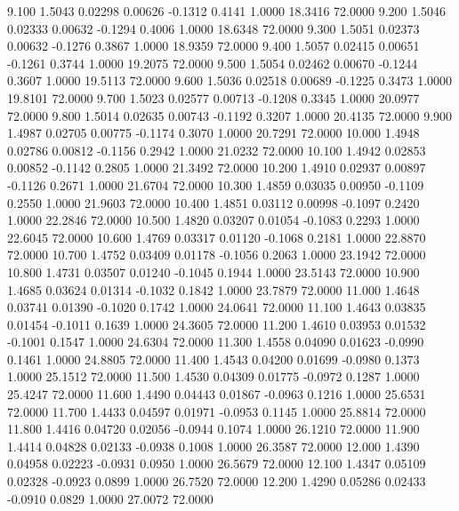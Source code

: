    9.100   1.5043   0.02298   0.00626  -0.1312   0.4141   1.0000  18.3416  72.0000
   9.200   1.5046   0.02333   0.00632  -0.1294   0.4006   1.0000  18.6348  72.0000
   9.300   1.5051   0.02373   0.00632  -0.1276   0.3867   1.0000  18.9359  72.0000
   9.400   1.5057   0.02415   0.00651  -0.1261   0.3744   1.0000  19.2075  72.0000
   9.500   1.5054   0.02462   0.00670  -0.1244   0.3607   1.0000  19.5113  72.0000
   9.600   1.5036   0.02518   0.00689  -0.1225   0.3473   1.0000  19.8101  72.0000
   9.700   1.5023   0.02577   0.00713  -0.1208   0.3345   1.0000  20.0977  72.0000
   9.800   1.5014   0.02635   0.00743  -0.1192   0.3207   1.0000  20.4135  72.0000
   9.900   1.4987   0.02705   0.00775  -0.1174   0.3070   1.0000  20.7291  72.0000
  10.000   1.4948   0.02786   0.00812  -0.1156   0.2942   1.0000  21.0232  72.0000
  10.100   1.4942   0.02853   0.00852  -0.1142   0.2805   1.0000  21.3492  72.0000
  10.200   1.4910   0.02937   0.00897  -0.1126   0.2671   1.0000  21.6704  72.0000
  10.300   1.4859   0.03035   0.00950  -0.1109   0.2550   1.0000  21.9603  72.0000
  10.400   1.4851   0.03112   0.00998  -0.1097   0.2420   1.0000  22.2846  72.0000
  10.500   1.4820   0.03207   0.01054  -0.1083   0.2293   1.0000  22.6045  72.0000
  10.600   1.4769   0.03317   0.01120  -0.1068   0.2181   1.0000  22.8870  72.0000
  10.700   1.4752   0.03409   0.01178  -0.1056   0.2063   1.0000  23.1942  72.0000
  10.800   1.4731   0.03507   0.01240  -0.1045   0.1944   1.0000  23.5143  72.0000
  10.900   1.4685   0.03624   0.01314  -0.1032   0.1842   1.0000  23.7879  72.0000
  11.000   1.4648   0.03741   0.01390  -0.1020   0.1742   1.0000  24.0641  72.0000
  11.100   1.4643   0.03835   0.01454  -0.1011   0.1639   1.0000  24.3605  72.0000
  11.200   1.4610   0.03953   0.01532  -0.1001   0.1547   1.0000  24.6304  72.0000
  11.300   1.4558   0.04090   0.01623  -0.0990   0.1461   1.0000  24.8805  72.0000
  11.400   1.4543   0.04200   0.01699  -0.0980   0.1373   1.0000  25.1512  72.0000
  11.500   1.4530   0.04309   0.01775  -0.0972   0.1287   1.0000  25.4247  72.0000
  11.600   1.4490   0.04443   0.01867  -0.0963   0.1216   1.0000  25.6531  72.0000
  11.700   1.4433   0.04597   0.01971  -0.0953   0.1145   1.0000  25.8814  72.0000
  11.800   1.4416   0.04720   0.02056  -0.0944   0.1074   1.0000  26.1210  72.0000
  11.900   1.4414   0.04828   0.02133  -0.0938   0.1008   1.0000  26.3587  72.0000
  12.000   1.4390   0.04958   0.02223  -0.0931   0.0950   1.0000  26.5679  72.0000
  12.100   1.4347   0.05109   0.02328  -0.0923   0.0899   1.0000  26.7520  72.0000
  12.200   1.4290   0.05286   0.02433  -0.0910   0.0829   1.0000  27.0072  72.0000
